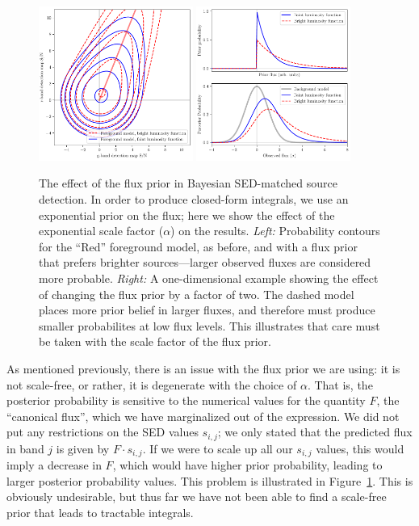 \documentclass[11pt,letterpaper,linenumbers]{aastex63}
\newcommand{\figref}[1]{\mbox{Figure~\ref{#1}}}
\begin{document}
\begin{figure}
    \begin{center}
    \includegraphics[width=0.45\textwidth]{prob-contours-c}
    \includegraphics[width=0.45\textwidth]{prob-1d}
    \caption{The effect of the flux prior in Bayesian
      SED-matched source detection.  In order to produce closed-form
      integrals, we use an exponential prior on the flux; here
      we show the effect of the exponential scale factor ($\alpha$) on
      the results.  \emph{Left:} Probability contours for the ``Red''
      foreground model, as before, and with a flux prior that
      prefers brighter sources---larger observed fluxes are considered
      more probable.  \emph{Right:} A one-dimensional example showing
      the effect of changing the flux prior by a factor of
      two.  The dashed model places more prior belief in larger
      fluxes, and therefore must produce smaller probabilites at low
      flux levels.  This illustrates that care must be taken with the
      scale factor of the flux prior.
      \label{fig:scaling}
    }
    \end{center}
\end{figure}


As mentioned previously, there is an issue with the flux prior we are
using: it is not scale-free, or rather, it is degenerate with the
choice of $\alpha$.  That is, the posterior probability is sensitive
to the numerical values for the quantity $F$, the ``canonical flux'',
which we have marginalized out of the expression.  We did not put any
restrictions on the SED values $s_{i,j}$; we only stated that the
predicted flux in band $j$ is given by $F \cdot s_{i,j}$.  If we were
to scale up all our $s_{i,j}$ values, this would imply a decrease in
$F$, which would have higher prior probability, leading to larger
posterior probability values.  This problem is illustrated in
\figref{fig:scaling}.  This is obviously undesirable, but thus far we
have not been able to find a scale-free prior that leads to tractable
integrals.
\end{document}
